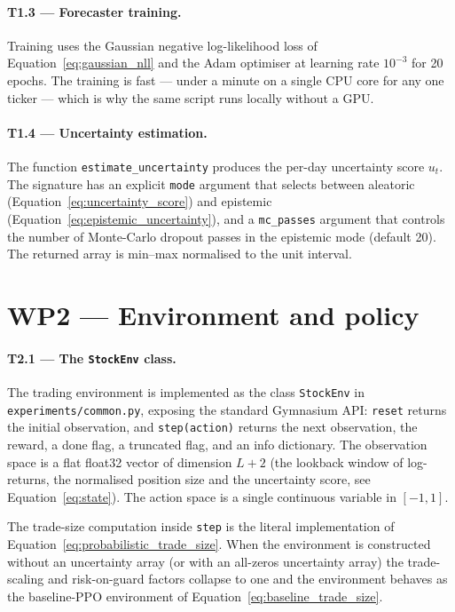 \paragraph{T1.3 --- Forecaster training.} Training uses the Gaussian negative log-likelihood loss of Equation~\ref{eq:gaussian_nll} and the Adam optimiser at learning rate $10^{-3}$ for 20 epochs. The training is fast --- under a minute on a single CPU core for any one ticker --- which is why the same script runs locally without a GPU.

\paragraph{T1.4 --- Uncertainty estimation.} The function \texttt{estimate\_uncertainty} produces the per-day uncertainty score $u_t$. The signature has an explicit \texttt{mode} argument that selects between aleatoric (Equation~\ref{eq:uncertainty_score}) and epistemic (Equation~\ref{eq:epistemic_uncertainty}), and a \texttt{mc\_passes} argument that controls the number of Monte-Carlo dropout passes in the epistemic mode (default 20). The returned array is min--max normalised to the unit interval.

\section{WP2 --- Environment and policy}
\label{sec:wp2}

\paragraph{T2.1 --- The \texttt{StockEnv} class.} The trading environment is implemented as the class \texttt{StockEnv} in \texttt{experiments/common.py}, exposing the standard Gymnasium API: \texttt{reset} returns the initial observation, and \texttt{step(action)} returns the next observation, the reward, a done flag, a truncated flag, and an info dictionary. The observation space is a flat float32 vector of dimension $L + 2$ (the lookback window of log-returns, the normalised position size and the uncertainty score, see Equation~\ref{eq:state}). The action space is a single continuous variable in $[-1, 1]$.

The trade-size computation inside \texttt{step} is the literal implementation of Equation~\ref{eq:probabilistic_trade_size}. When the environment is constructed without an uncertainty array (or with an all-zeros uncertainty array) the trade-scaling and risk-on-guard factors collapse to one and the environment behaves as the baseline-PPO environment of Equation~\ref{eq:baseline_trade_size}.

